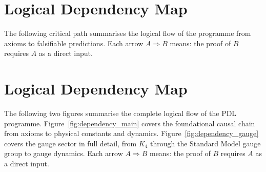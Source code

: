 \documentclass[11pt,a4paper]{article}
\theoremstyle{plain}
\theoremstyle{definition}
\theoremstyle{remark}
\begin{document}
\clearpage

\section{Logical Dependency Map}
\label{sec:dependency}

The following critical path summarises the logical flow of the programme from axioms to falsifiable predictions. Each arrow $A\Rightarrow B$ means: the proof of $B$ requires $A$ as a direct input.

\section{Logical Dependency Map}
\label{sec:dependency2}

The following two figures summarise the complete logical flow of the PDL programme. Figure~\ref{fig:dependency_main} covers the foundational causal chain from axioms to physical constants and dynamics. Figure~\ref{fig:dependency_gauge} covers the gauge sector in full detail, from $K_4$ through the Standard Model gauge group to gauge dynamics. Each arrow $A\Rightarrow B$ means: the proof of $B$ requires $A$ as a direct input.
\end{document}
